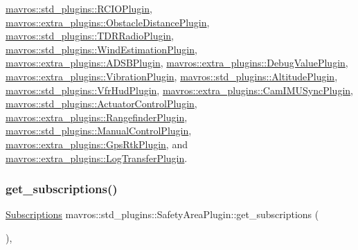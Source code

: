 \mbox{\hyperlink{group__plugin_gafd86a5abaa163c230462ad68151abdff}{mavros\+::std\+\_\+plugins\+::\+R\+C\+I\+O\+Plugin}}, \mbox{\hyperlink{group__plugin_ga03eef1ca035e4ab4ca9eb0841b6d9eef}{mavros\+::extra\+\_\+plugins\+::\+Obstacle\+Distance\+Plugin}}, \mbox{\hyperlink{group__plugin_ga2cc39d74800d519194a4f65eea343f16}{mavros\+::std\+\_\+plugins\+::\+T\+D\+R\+Radio\+Plugin}}, \mbox{\hyperlink{group__plugin_ga7db9ebfdb92e2537b3b3b844a2483617}{mavros\+::std\+\_\+plugins\+::\+Wind\+Estimation\+Plugin}}, \mbox{\hyperlink{group__plugin_gac151290664f8ba679ec27bd8c55b031e}{mavros\+::extra\+\_\+plugins\+::\+A\+D\+S\+B\+Plugin}}, \mbox{\hyperlink{group__plugin_ga9ae270242b82f1aebfcccc109c008be1}{mavros\+::extra\+\_\+plugins\+::\+Debug\+Value\+Plugin}}, \mbox{\hyperlink{group__plugin_gaf1faf27433bea5d716042d52aeaee805}{mavros\+::extra\+\_\+plugins\+::\+Vibration\+Plugin}}, \mbox{\hyperlink{group__plugin_gafd32c19f38dc1c1c634d9090b3319af6}{mavros\+::std\+\_\+plugins\+::\+Altitude\+Plugin}}, \mbox{\hyperlink{group__plugin_ga432994278dd02aa09f57ab7dc93fa109}{mavros\+::std\+\_\+plugins\+::\+Vfr\+Hud\+Plugin}}, \mbox{\hyperlink{group__plugin_gad1579267289ff44ce0ddcb795e480663}{mavros\+::extra\+\_\+plugins\+::\+Cam\+I\+M\+U\+Sync\+Plugin}}, \mbox{\hyperlink{group__plugin_ga9f95e6748d25efba2ab30f5d701cf17c}{mavros\+::std\+\_\+plugins\+::\+Actuator\+Control\+Plugin}}, \mbox{\hyperlink{group__plugin_ga8911e15033c33875a44b518584464b81}{mavros\+::extra\+\_\+plugins\+::\+Rangefinder\+Plugin}}, \mbox{\hyperlink{group__plugin_ga2cd6218d2064c57672b01df2900c3de2}{mavros\+::std\+\_\+plugins\+::\+Manual\+Control\+Plugin}}, \mbox{\hyperlink{group__plugin_ga21af691b0770c7e0b87e5fd733b0145a}{mavros\+::extra\+\_\+plugins\+::\+Gps\+Rtk\+Plugin}}, and \mbox{\hyperlink{classmavros_1_1extra__plugins_1_1LogTransferPlugin_a3aa5677fcfe97c13bd7d940345290aa6}{mavros\+::extra\+\_\+plugins\+::\+Log\+Transfer\+Plugin}}.

\mbox{\label{group__plugin_gade85cfda6dd25076ce1a72955806fe45}} 
\subsubsection{\texorpdfstring{get\_subscriptions()}{get\_subscriptions()}\hspace{0.1cm}{\footnotesize\ttfamily [28/41]}}
{\footnotesize\ttfamily \mbox{\hyperlink{group__plugin_ga8967d61fc77040e0c3ea5a4585d62a09}{Subscriptions}} mavros\+::std\+\_\+plugins\+::\+Safety\+Area\+Plugin\+::get\+\_\+subscriptions (\begin{DoxyParamCaption}{ }\end{DoxyParamCaption})\hspace{0.3cm}{\ttfamily [inline]}, {\ttfamily [virtual]}}



